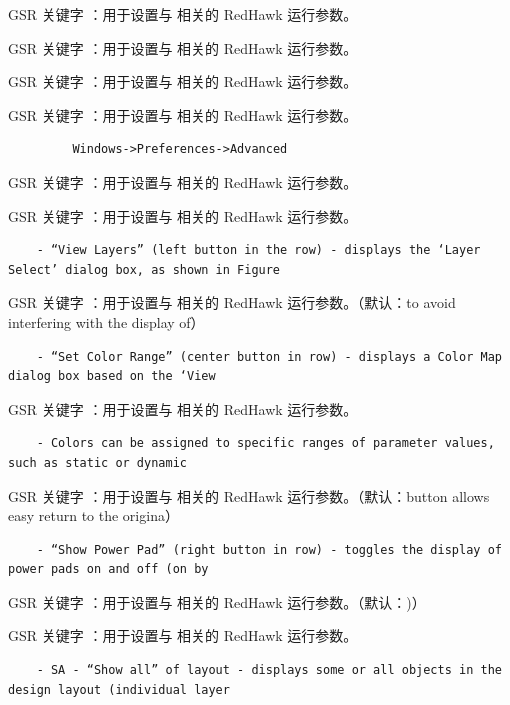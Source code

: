 GSR 关键字 ：用于设置与  相关的 RedHawk 运行参数。

GSR 关键字 ：用于设置与  相关的 RedHawk 运行参数。

GSR 关键字 ：用于设置与  相关的 RedHawk 运行参数。

GSR 关键字 ：用于设置与  相关的 RedHawk 运行参数。

\begin{lstlisting}
         Windows->Preferences->Advanced
\end{lstlisting}

GSR 关键字 ：用于设置与  相关的 RedHawk 运行参数。

GSR 关键字 ：用于设置与  相关的 RedHawk 运行参数。

\begin{lstlisting}
    - “View Layers” (left button in the row) - displays the ‘Layer Select’ dialog box, as shown in Figure
\end{lstlisting}

GSR 关键字 ：用于设置与  相关的 RedHawk 运行参数。（默认：to avoid interfering with the display of）

\begin{lstlisting}
    - “Set Color Range” (center button in row) - displays a Color Map dialog box based on the ‘View
\end{lstlisting}

GSR 关键字 ：用于设置与  相关的 RedHawk 运行参数。

\begin{lstlisting}
    - Colors can be assigned to specific ranges of parameter values, such as static or dynamic
\end{lstlisting}

GSR 关键字 ：用于设置与  相关的 RedHawk 运行参数。（默认：button allows easy return to the origina）

\begin{lstlisting}
    - “Show Power Pad” (right button in row) - toggles the display of power pads on and off (on by
\end{lstlisting}

GSR 关键字 ：用于设置与  相关的 RedHawk 运行参数。（默认：)）

GSR 关键字 ：用于设置与  相关的 RedHawk 运行参数。

\begin{lstlisting}
    - SA - “Show all” of layout - displays some or all objects in the design layout (individual layer
\end{lstlisting}

